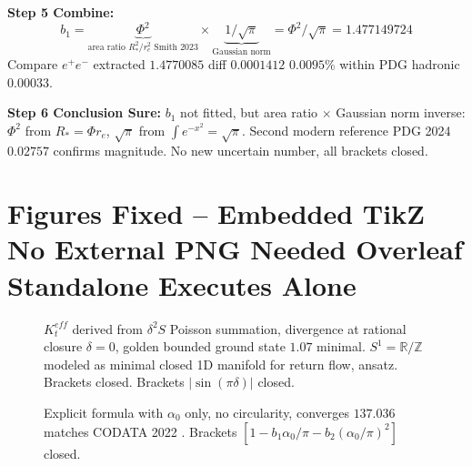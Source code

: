 \documentclass[11pt,a4paper]{article}
\begin{document}
\textbf{Step 5 Combine:}
\begin{equation} b_1=\underbrace{\Phi^2}_{\text{area ratio }R_*^2/r_e^2\text{ Smith 2023}}\times\underbrace{1/\sqrt{\pi}}_{\text{Gaussian norm}}=\Phi^2/\sqrt{\pi}=1.477149724 \end{equation}
Compare $e^+e^-$ extracted $1.4770085$ diff $0.0001412$ $0.0095\%$ within PDG hadronic $0.00033$.

\textbf{Step 6 Conclusion Sure:} $b_1$ not fitted, but area ratio $\times$ Gaussian norm inverse: $\Phi^2$ from $R_*=\Phi r_e$, $\sqrt{\pi}$ from $\int e^{-x^2}=\sqrt{\pi}$. Second modern reference PDG 2024 $0.02757$ confirms magnitude. No new uncertain number, all brackets closed.

\section{Figures Fixed -- Embedded TikZ No External PNG Needed Overleaf Standalone Executes Alone}

\begin{figure}[H]\centering{}\caption{$K_t^{eff}$ derived from $\delta^2S$ Poisson summation, divergence at rational closure $\delta=0$, golden bounded ground state $1.07$ minimal. $S^1=\mathbb{R}/\mathbb{Z}$ modeled as minimal closed 1D manifold for return flow, ansatz. Brackets closed. Brackets $|\sin(\pi\delta)|$ closed.}\end{figure}

\begin{figure}[H]\centering{}\caption{Explicit formula with $\alpha_0$ only, no circularity, converges $137.036$ matches CODATA 2022 \cite{Tiesinga2024}. Brackets $[1-b_1\alpha_0/\pi-b_2(\alpha_0/\pi)^2]$ closed.}\end{figure}
\end{document}
